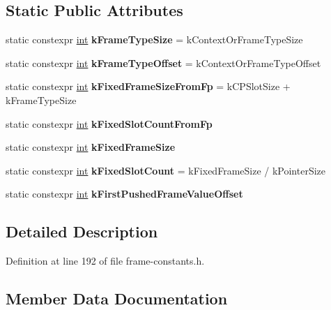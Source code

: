 \subsection*{Static Public Attributes}
\begin{DoxyCompactItemize}
\item 
\mbox{\label{classv8_1_1internal_1_1TypedFrameConstants_a08b0eb5aa05f7065dfcc97cffbe4e272}} 
static constexpr \mbox{\hyperlink{classint}{int}} {\bfseries k\+Frame\+Type\+Size} = k\+Context\+Or\+Frame\+Type\+Size
\item 
\mbox{\label{classv8_1_1internal_1_1TypedFrameConstants_af1ba303c175d9600d592a04eec3803c0}} 
static constexpr \mbox{\hyperlink{classint}{int}} {\bfseries k\+Frame\+Type\+Offset} = k\+Context\+Or\+Frame\+Type\+Offset
\item 
\mbox{\label{classv8_1_1internal_1_1TypedFrameConstants_aec7d44b578d300b19f5aba3a210e9fbb}} 
static constexpr \mbox{\hyperlink{classint}{int}} {\bfseries k\+Fixed\+Frame\+Size\+From\+Fp} = k\+C\+P\+Slot\+Size + k\+Frame\+Type\+Size
\item 
static constexpr \mbox{\hyperlink{classint}{int}} {\bfseries k\+Fixed\+Slot\+Count\+From\+Fp}
\item 
static constexpr \mbox{\hyperlink{classint}{int}} {\bfseries k\+Fixed\+Frame\+Size}
\item 
\mbox{\label{classv8_1_1internal_1_1TypedFrameConstants_a6226479b50df1ff27caaf096eb07f394}} 
static constexpr \mbox{\hyperlink{classint}{int}} {\bfseries k\+Fixed\+Slot\+Count} = k\+Fixed\+Frame\+Size / k\+Pointer\+Size
\item 
static constexpr \mbox{\hyperlink{classint}{int}} {\bfseries k\+First\+Pushed\+Frame\+Value\+Offset}
\end{DoxyCompactItemize}


\subsection{Detailed Description}


Definition at line 192 of file frame-\/constants.\+h.



\subsection{Member Data Documentation}
\mbox{\label{classv8_1_1internal_1_1TypedFrameConstants_a7401b427106cf0a8307072f2fce75752}} 
